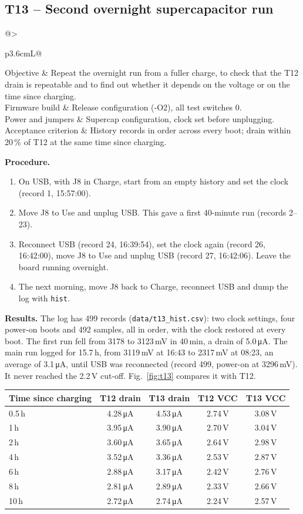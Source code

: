 \documentclass[11pt,a4paper]{article}
\makeatletter
\newcommand{\uA}{\,\si{\micro\ampere}}
\newcommand{\code}[1]{\texttt{#1}}
\newcommand{\testcase}[7]{%
  \subsection{#1 -- #2}\label{#3}
  \noindent\begin{tabularx}{\textwidth}{@{}>{\raggedright\arraybackslash\bfseries}p{3.6cm}L@{}}
  \toprule
  Objective & #4 \\
  Firmware build & #5 \\
  Power and jumpers & #6 \\
  Acceptance criterion & #7 \\
  \bottomrule
  \end{tabularx}\par\medskip}
\makeatother
\begin{document}
\testcase{T13}{Second overnight supercapacitor run}{t:drain2}
  {Repeat the overnight run from a fuller charge, to check that the T12 drain is repeatable and to find out whether it depends on the voltage or on the time since charging.}
  {Release configuration (-O2), all test switches 0.}
  {Supercap configuration, clock set before unplugging.}
  {History records in order across every boot; drain within 20\,\% of T12 at the same time since charging.}

\textbf{Procedure.}
\begin{enumerate}
  \item On USB, with J8 in Charge, start from an empty history and set the clock (record 1, 15:57:00).
  \item Move J8 to Use and unplug USB. This gave a first 40-minute run (records 2--23).
  \item Reconnect USB (record 24, 16:39:54), set the clock again (record 26, 16:42:00), move J8 to Use and unplug USB (record 27, 16:42:06). Leave the board running overnight.
  \item The next morning, move J8 back to Charge, reconnect USB and dump the log with \code{hist}.
\end{enumerate}

\textbf{Results.} The log has 499 records (\code{data/t13\_hist.csv}): two clock settings, four power-on boots and 492 samples, all in order, with the clock restored at every boot. The first run fell from 3178 to 3123\,mV in 40\,min, a drain of 5.0\uA. The main run logged for 15.7\,h, from 3119\,mV at 16:43 to 2317\,mV at 08:23, an average of 3.1\uA, until USB was reconnected (record 499, power-on at 3296\,mV). It never reached the 2.2\,V cut-off. Fig.~\ref{fig:t13} compares it with T12.

\begin{table}[H]
\centering\small
\begin{tabular}{@{}lcccc@{}}
\toprule
Time since charging & T12 drain & T13 drain & T12 VCC & T13 VCC \\
\midrule
0.5\,h & 4.28\uA & 4.53\uA & 2.74\,V & 3.08\,V \\
1\,h & 3.95\uA & 3.90\uA & 2.70\,V & 3.04\,V \\
2\,h & 3.60\uA & 3.65\uA & 2.64\,V & 2.98\,V \\
4\,h & 3.52\uA & 3.36\uA & 2.53\,V & 2.87\,V \\
6\,h & 2.88\uA & 3.17\uA & 2.42\,V & 2.76\,V \\
8\,h & 2.81\uA & 2.89\uA & 2.33\,V & 2.66\,V \\
10\,h & 2.72\uA & 2.74\uA & 2.24\,V & 2.57\,V \\
\bottomrule
\end{tabular}
\end{table}
\end{document}
